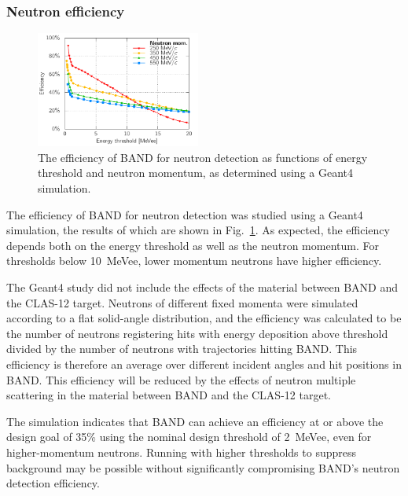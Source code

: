 \documentclass[3p,final,twocolumn]{elsarticle}
\begin{document}
\subsubsection{Neutron efficiency}

\begin{figure}[tb]
	\centering
		\includegraphics[width=0.48\textwidth]{eff_geant.pdf}
	\caption{The efficiency of BAND for neutron detection as functions of energy threshold and neutron
          momentum, as determined using a Geant4 simulation.}
	\label{fig:eff}
\end{figure}

The efficiency of BAND for neutron detection was studied using a Geant4 simulation, the results of which
are shown in Fig.~\ref{fig:eff}. As expected, the efficiency depends both on the energy threshold 
as well as the neutron momentum. For thresholds below 10~MeVee, lower momentum neutrons have higher
efficiency.

The Geant4 study did not include the effects of the material between BAND
and the CLAS-12 target. Neutrons of different fixed momenta were simulated according
to a flat solid-angle distribution, and the efficiency was calculated to be the number of neutrons
registering hits with energy deposition above threshold divided by the number of neutrons with 
trajectories hitting BAND. This efficiency is therefore an average over different incident angles
and hit positions in BAND.  This efficiency will be reduced by the effects of
neutron multiple
scattering in the material between BAND and the CLAS-12 target. 

The simulation indicates that BAND can achieve an efficiency at or
above the design goal of 35\% using the nominal design threshold of 
2~MeVee, even for higher-momentum neutrons. Running with higher thresholds to suppress background
may be possible without significantly compromising BAND's neutron
detection efficiency.


\end{document}
